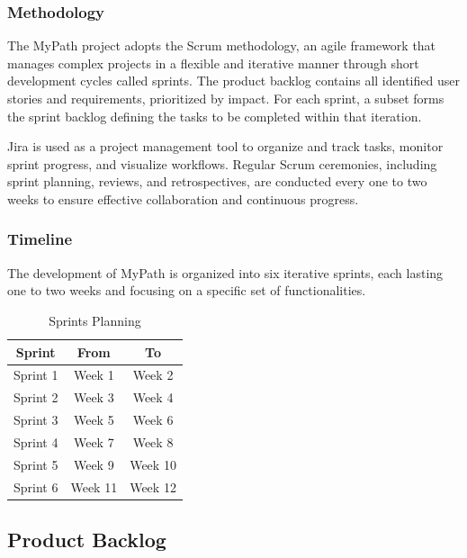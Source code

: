 \documentclass[12pt,a4paper]{article}
\begin{document}
\subsubsection{Methodology}

The MyPath project adopts the Scrum methodology, an agile framework that manages complex projects in a flexible and iterative manner through short development cycles called sprints. The product backlog contains all identified user stories and requirements, prioritized by impact. For each sprint, a subset forms the sprint backlog defining the tasks to be completed within that iteration.

Jira is used as a project management tool to organize and track tasks, monitor sprint progress, and visualize workflows. Regular Scrum ceremonies, including sprint planning, reviews, and retrospectives, are conducted every one to two weeks to ensure effective collaboration and continuous progress.

\subsubsection{Timeline}

The development of MyPath is organized into six iterative sprints, each lasting one to two weeks and focusing on a specific set of functionalities.

\begin{table}[H]
\centering
\begin{tabular}{|c|c|c|}
\hline
\textbf{Sprint} & \textbf{From} & \textbf{To} \\
\hline
Sprint 1 & Week 1  & Week 2  \\
Sprint 2 & Week 3  & Week 4  \\
Sprint 3 & Week 5  & Week 6  \\
Sprint 4 & Week 7  & Week 8  \\
Sprint 5 & Week 9  & Week 10 \\
Sprint 6 & Week 11 & Week 12 \\
\hline
\end{tabular}
\caption{Sprints Planning}
\end{table}

\subsection{Product Backlog}
\end{document}
